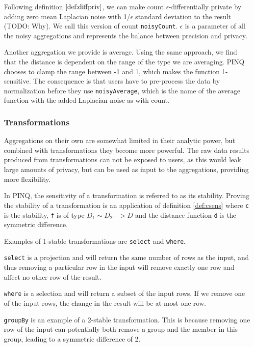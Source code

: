 \documentclass[12pt]{article}
\begin{document}
Following definition $\ref{def:diffpriv}$, we can make count $\epsilon$-differentially private by adding zero mean Laplacian noise with 1/$\epsilon$ standard deviation to the result (TODO: Why).
We call this version of count \texttt{noisyCount}.
$\epsilon$ is a parameter of all the noisy aggregations and represents the balance between precision and privacy.

Another aggregation we provide is average.
Using the same approach, we find that the distance is dependent on the range of the type we are averaging.
PINQ chooses to clamp the range between -1 and 1, which makes the function 1-sensitive.
The consequence is that users have to pre-process the data by normalization before they use \texttt{noisyAverage}, which is the name of the average function with the added Laplacian noise as with count.

\subsubsection{Transformations}

Aggregations on their own are somewhat limited in their analytic power, but combined with transformations they become more powerful.
The raw data results produced from transformations can not be exposed to users, as this would leak large amounts of privacy, but can be used as input to the aggregations, providing more flexibility.

In PINQ, the sensitivity of a transformation is referred to as its stability.
Proving the stability of a transformation is an application of definition \ref{def:csens} where \texttt{c} is the stability, \texttt{f} is of type  $D_1 \sim D_2 -> D$ and the distance function \texttt{d} is the symmetric difference.

Examples of 1-stable transformations are \texttt{select} and \texttt{where}.

\texttt{select} is a projection and will return the same number of rows as the input, and thus removing a particular row in the input will remove exactly one row and affect no other row of the result.

\texttt{where} is a selection and will return a subset of the input rows.
If we remove one of the input rows, the change in the result will be at most one row.

\texttt{groupBy} is an example of a 2-stable transformation.
This is because removing one row of the input can potentially both remove a group and the member in this group, leading to a symmetric difference of 2.
\end{document}
